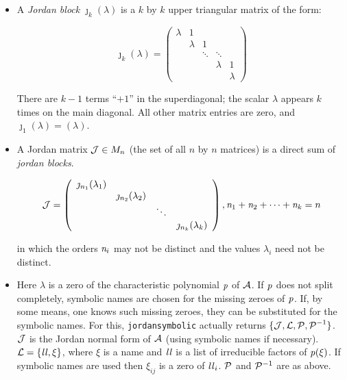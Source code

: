 \begin{itemize}
\item A {\it Jordan block} ${\jmath}_{k}(\lambda)$ is a $k$ by $k$
      upper triangular matrix of the form:

      \begin{displaymath}
      {\jmath}_{k}(\lambda) = \left( \begin{array}{ccccc} \lambda & 1
      &  &  & \\  &  \lambda & 1  & & \\ &
      & \ddots & \ddots & \\ &  &  &  \lambda & 1 \\ &
      &  &  & \lambda \end{array} \right)
      \end{displaymath}

      There are $k-1$ terms ``$+1$'' in the superdiagonal; the scalar
      $\lambda$ appears $k$ times on the main diagonal. All other
      matrix entries are zero, and ${\jmath}_{1}(\lambda) = (\lambda)$.

\item A Jordan matrix ${\cal J} \in M_{n}$ (the set of all $n$ by $n$
      matrices) is a direct sum of {\it jordan blocks}.

      \begin{displaymath}
      {\cal J} = \left( \begin{array}{cccc} \jmath_{n_1}(\lambda_{1})
      \\  & \jmath_{n_2}(\lambda_{2}) \\ & & \ddots \\ & & &
      \jmath_{n_k}(\lambda_{k}) \end{array} \right),
      {\it n}_{1}+{\it n}_{2}+\cdots +{\it n}_{k} = n
      \end{displaymath}

      in which the orders ${\it n}_{i}$ may not be distinct and the
      values ${\lambda_{i}}$ need not be distinct.

\item Here ${\lambda}$ is a zero of the characteristic polynomial
      ${\it p}$ of ${\cal A}$. If ${\it p}$ does not split completely,
      symbolic names are chosen for the missing zeroes of ${\it p}$.
      If, by some means, one knows such missing zeroes, they can be
      substituted for the symbolic names. For this,
      {\tt jordansymbolic} actually returns $\{ {\cal J,L,P,P}^{-1} \}$.
      ${\cal J}$ is the Jordan normal form of ${\cal A}$ (using
      symbolic names if necessary). ${\cal L} = \{ {\it ll}, \xi \}$,
      where $\xi$ is a name and ${\it ll}$ is a list of irreducible
      factors of ${\it p}(\xi)$. If symbolic names are used then
      ${\xi}_{ij}$ is a zero of ${\it ll}_{i}$. ${\cal P}$ and
      ${\cal P}^{-1}$ are as above.
\end{itemize}

